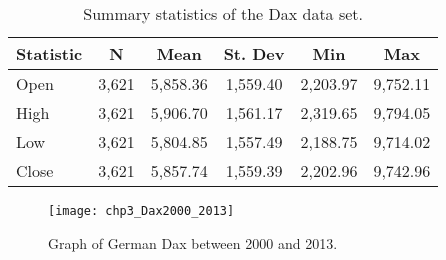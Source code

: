


\begin{table}[!htbp] \centering
\caption[Dax summary statistics.]{Summary statistics of the Dax data set.}
\label{tab:daxsum}
\begin{tabular}{lccccc}
\toprule
Statistic & N & Mean & St. Dev & Min & Max \\
\midrule
Open  & 3,621 & 5,858.36 & 1,559.40 & 2,203.97 & 9,752.11 \\
High  & 3,621 & 5,906.70 & 1,561.17 & 2,319.65 & 9,794.05 \\
Low   & 3,621 & 5,804.85 & 1,557.49 & 2,188.75 & 9,714.02 \\
Close & 3,621 & 5,857.74 & 1,559.39 & 2,202.96 & 9,742.96 \\
\bottomrule
\end{tabular}
\end{table}


\begin{figure}[tbph]
\centering
\texttt{[image: chp3\_Dax2000\_2013]}
\caption[Graph of Dax.]{Graph of German Dax between 2000 and 2013.}
\label{fig:Dax2000_2013}
\end{figure}

